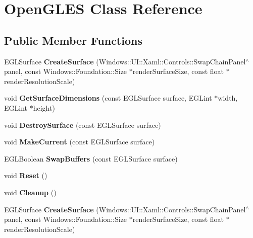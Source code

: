 \hypertarget{classOpenGLES}{}\section{Open\+G\+L\+ES Class Reference}
\label{classOpenGLES}
\subsection*{Public Member Functions}
\begin{DoxyCompactItemize}
\item 
\mbox{\label{classOpenGLES_ac81a084bf9209c55ac354f1579b561dc}} 
E\+G\+L\+Surface {\bfseries Create\+Surface} (Windows\+::\+U\+I\+::\+Xaml\+::\+Controls\+::\+Swap\+Chain\+Panel$^\wedge$ panel, const Windows\+::\+Foundation\+::\+Size $\ast$render\+Surface\+Size, const float $\ast$render\+Resolution\+Scale)
\item 
\mbox{\label{classOpenGLES_a33027e4ee48c7524a11d0ba072f0428a}} 
void {\bfseries Get\+Surface\+Dimensions} (const E\+G\+L\+Surface surface, E\+G\+Lint $\ast$width, E\+G\+Lint $\ast$height)
\item 
\mbox{\label{classOpenGLES_a282b02e045d4db1bccb1e97c6301eda9}} 
void {\bfseries Destroy\+Surface} (const E\+G\+L\+Surface surface)
\item 
\mbox{\label{classOpenGLES_ac16d83572dee3dca15f84b987d238825}} 
void {\bfseries Make\+Current} (const E\+G\+L\+Surface surface)
\item 
\mbox{\label{classOpenGLES_a521858d67ba9334e3d09adea544d02c8}} 
E\+G\+L\+Boolean {\bfseries Swap\+Buffers} (const E\+G\+L\+Surface surface)
\item 
\mbox{\label{classOpenGLES_abb6bd80a4e3ca4a799768ee00326ba91}} 
void {\bfseries Reset} ()
\item 
\mbox{\label{classOpenGLES_adec02660f51d61862eabb9e53dfbff4f}} 
void {\bfseries Cleanup} ()
\item 
\mbox{\label{classOpenGLES_ac81a084bf9209c55ac354f1579b561dc}} 
E\+G\+L\+Surface {\bfseries Create\+Surface} (Windows\+::\+U\+I\+::\+Xaml\+::\+Controls\+::\+Swap\+Chain\+Panel$^\wedge$ panel, const Windows\+::\+Foundation\+::\+Size $\ast$render\+Surface\+Size, const float $\ast$render\+Resolution\+Scale)

\end{DoxyCompactItemize}
